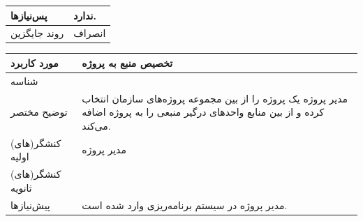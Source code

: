 \begin{table}[H]
\begin{tabular}{|p{3cm}|p{10cm}|}
		پس‌نیازها &
		ندارد. \\
		
		\hline
		
		روند جایگزین
		& انصراف \\
		\hline
		
	\end{tabular}
\end{table}





\begin{table}[H]
	\centering
	\begin{tabular}{|p{3cm}|p{10cm}|}
		\hline
		
		مورد کاربرد	& تخصیص منبع به پروژه  \\
		\hline
		
		شناسه & 
		\stepcounter{usecase_ID}
		
		\arabic{usecase_ID} \\
		
		\hline
		
		توضیح مختصر & مدیر پروژه یک پروژه را از بین مجموعه پروژه‌های سازمان انتخاب کرده و از بین منابع واحد‌های درگیر منبعی را به پروژه اضافه می‌کند. \\
		\hline
		
		کنشگر(های) اولیه & مدیر پروژه \\
		\hline
		
		کنشگر(های) ثانویه&  \\
		\hline
		
		پیش‌نیازها &
		مدیر پروژه در سیستم برنامه‌ریزی وارد شده است.\\
		\hline
		

\end{tabular}
\end{table}
